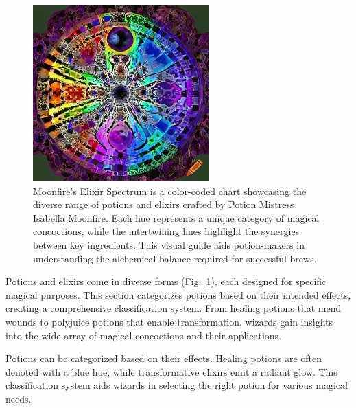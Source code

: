 \begin{figure}
    \includegraphics[width=\textwidth]{fig/img2.png}
    \caption{Moonfire's Elixir Spectrum \cite{moonfireelixirs2023} is a color-coded chart showcasing the diverse range of potions and elixirs crafted by Potion Mistress Isabella Moonfire. Each hue represents a unique category of magical concoctions, while the intertwining lines highlight the synergies between key ingredients. This visual guide aids potion-makers in understanding the alchemical balance required for successful brews.}
    \label{fig:img2}
  \end{figure}

Potions and elixirs come in diverse forms (Fig.~\ref{fig:img2}), each designed for specific magical purposes. This section categorizes potions based on their intended effects, creating a comprehensive classification system. From healing potions that mend wounds to polyjuice potions that enable transformation, wizards gain insights into the wide array of magical concoctions and their applications.

Potions can be categorized based on their effects. Healing potions are often denoted with a blue hue, while transformative elixirs emit a radiant glow. This classification system aids wizards in selecting the right potion for various magical needs.


